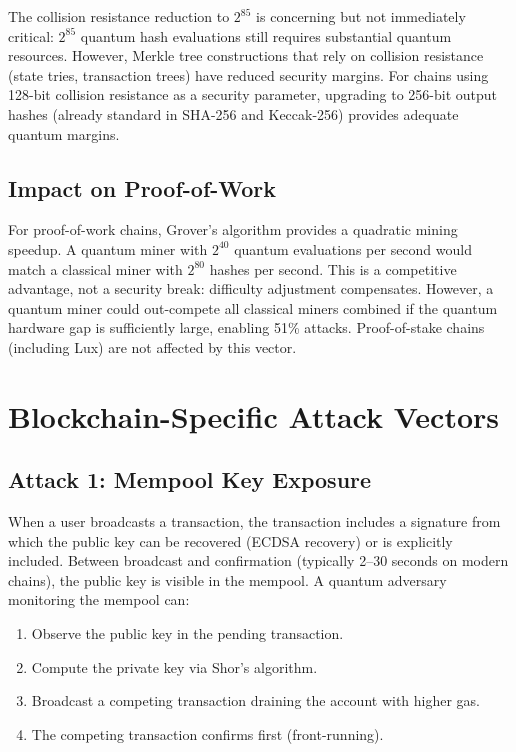 \documentclass[11pt,a4paper]{article}
\begin{document}
The collision resistance reduction to $2^{85}$ is concerning but not immediately
critical: $2^{85}$ quantum hash evaluations still requires substantial quantum
resources. However, Merkle tree constructions that rely on collision resistance
(state tries, transaction trees) have reduced security margins. For chains using
128-bit collision resistance as a security parameter, upgrading to 256-bit output
hashes (already standard in SHA-256 and Keccak-256) provides adequate quantum margins.

\subsection{Impact on Proof-of-Work}

For proof-of-work chains, Grover's algorithm provides a quadratic mining speedup. A
quantum miner with $2^{40}$ quantum evaluations per second would match a classical
miner with $2^{80}$ hashes per second. This is a competitive advantage, not a
security break: difficulty adjustment compensates. However, a quantum miner could
out-compete all classical miners combined if the quantum hardware gap is sufficiently
large, enabling 51\% attacks. Proof-of-stake chains (including Lux) are not affected
by this vector.

\section{Blockchain-Specific Attack Vectors}
\label{sec:attack-vectors}

\subsection{Attack 1: Mempool Key Exposure}

When a user broadcasts a transaction, the transaction includes a signature from which
the public key can be recovered (ECDSA recovery) or is explicitly included. Between
broadcast and confirmation (typically 2--30 seconds on modern chains), the public key
is visible in the mempool. A quantum adversary monitoring the mempool can:

\begin{enumerate}[leftmargin=2em]
  \item Observe the public key in the pending transaction.
  \item Compute the private key via Shor's algorithm.
  \item Broadcast a competing transaction draining the account with higher gas.
  \item The competing transaction confirms first (front-running).
\end{enumerate}
\end{document}

